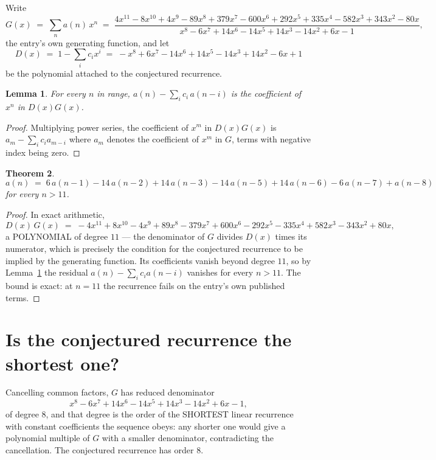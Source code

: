 \documentclass[11pt,a4paper]{article}
\theoremstyle{plain}
\newtheorem{theorem}{Theorem}
\newtheorem{lemma}[theorem]{Lemma}
\theoremstyle{definition}
\begin{document}
Write
\[
G(x)\;=\;\sum_{n}a(n)\,x^{n}\;=\;\frac{4 x^{11} - 8 x^{10} + 4 x^{9} - 89 x^{8} + 379 x^{7} - 600 x^{6} + 292 x^{5} + 335 x^{4} - 582 x^{3} + 343 x^{2} - 80 x}{x^{8} - 6 x^{7} + 14 x^{6} - 14 x^{5} + 14 x^{3} - 14 x^{2} + 6 x - 1},
\]
the entry's own generating function, and let
\[
D(x)\;=\;1-\sum_i c_i x^{i}\;=\;- x^{8} + 6 x^{7} - 14 x^{6} + 14 x^{5} - 14 x^{3} + 14 x^{2} - 6 x + 1
\]
be the polynomial attached to the conjectured recurrence.

\begin{lemma}\label{lem:key}
For every $n$ in range, $a(n)-\sum_i c_i\,a(n-i)$ is the coefficient of $x^{n}$ in
$D(x)G(x)$.
\end{lemma}

\begin{proof}
Multiplying power series, the coefficient of $x^{m}$ in $D(x)G(x)$ is
$a_m-\sum_i c_i a_{m-i}$ where $a_m$ denotes the coefficient of $x^{m}$ in $G$, terms with
negative index being zero.
\end{proof}

\begin{theorem}
\[
a(n)\;=\;6\,a(n-1) - 14\,a(n-2) + 14\,a(n-3) - 14\,a(n-5) + 14\,a(n-6) - 6\,a(n-7) + a(n-8)
\]
for every $n>11$.
\end{theorem}

\begin{proof}
In exact arithmetic,
\[
D(x)\,G(x)\;=\;- 4 x^{11} + 8 x^{10} - 4 x^{9} + 89 x^{8} - 379 x^{7} + 600 x^{6} - 292 x^{5} - 335 x^{4} + 582 x^{3} - 343 x^{2} + 80 x,
\]
a POLYNOMIAL of degree $11$ --- the denominator of $G$ divides $D(x)$ times its numerator,
which is precisely the condition for the conjectured recurrence to be implied by the
generating function. Its coefficients vanish beyond degree $11$, so by
Lemma~\ref{lem:key} the residual $a(n)-\sum_ic_ia(n-i)$ vanishes for every
$n>11$. The bound is exact: at $n=11$ the recurrence fails on the entry's own published terms.
\end{proof}

\section{Is the conjectured recurrence the shortest one?}

Cancelling common factors, $G$ has reduced denominator
\[
x^{8} - 6 x^{7} + 14 x^{6} - 14 x^{5} + 14 x^{3} - 14 x^{2} + 6 x - 1,
\]
of degree $8$, and that degree is the order of the SHORTEST linear recurrence with
constant coefficients the sequence obeys: any shorter one would give a polynomial multiple of
$G$ with a smaller denominator, contradicting the cancellation. The conjectured recurrence has
order $8$.
\end{document}

